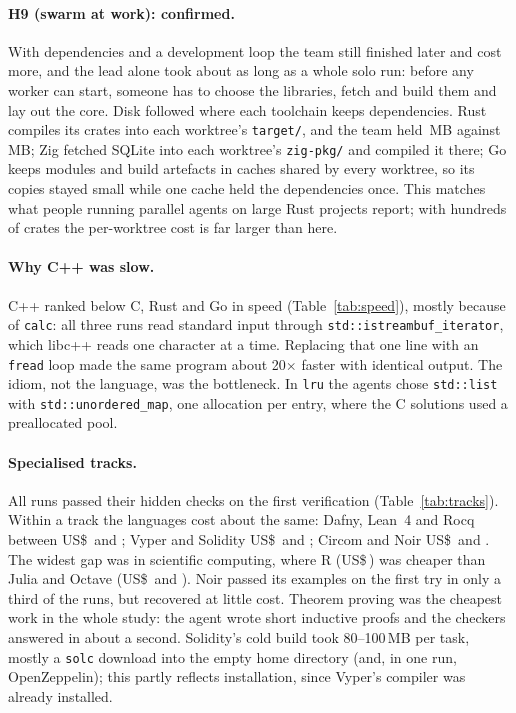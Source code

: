 \documentclass[11pt,a4paper]{article}
\begin{document}
\paragraph{H9 (swarm at work): confirmed.} With dependencies and a development loop the team still finished
later and cost more, and the lead alone took about as long as a whole solo run: before any worker can start,
someone has to choose the libraries, fetch and build them and lay out the core. Disk followed where each
toolchain keeps dependencies. Rust compiles its crates into each worktree's \texttt{target/}, and the team
held \NotesPeakTeamRust\,MB against \NotesPeakSoloRust\,MB; Zig fetched SQLite into each worktree's
\texttt{zig-pkg/} and compiled it there; Go keeps modules and build artefacts in caches shared by every
worktree, so its copies stayed small while one cache held the dependencies once. This matches what people
running parallel agents on large Rust projects report; with hundreds of crates the per-worktree cost is far
larger than here.

\paragraph{Why C++ was slow.} C++ ranked below C, Rust and Go in speed (Table~\ref{tab:speed}), mostly
because of \texttt{calc}: all three runs read standard input through \texttt{std::istreambuf\_iterator},
which libc++ reads one character at a time. Replacing that one line with an \texttt{fread} loop made the
same program about 20$\times$ faster with identical output. The idiom, not the language, was the
bottleneck. In \texttt{lru} the agents chose \texttt{std::list} with \texttt{std::unordered\_map}, one
allocation per entry, where the C solutions used a preallocated pool.

\paragraph{Specialised tracks.} All \NTrackRuns{} runs passed their hidden checks on the first
verification (Table~\ref{tab:tracks}). Within a track the languages cost about the same: Dafny,
Lean~4 and Rocq between US\$\,\TrkProofsDafny{} and \TrkProofsRocq{}; Vyper and Solidity
US\$\,\TrkEvmVyper{} and \TrkEvmSolidity{}; Circom and Noir US\$\,\TrkZkCircom{} and \TrkZkNoir{}. The
widest gap was in scientific computing, where R (US\$\,\TrkNumericR) was cheaper than Julia and Octave
(US\$\,\TrkNumericJulia{} and \TrkNumericOctave). Noir passed its examples on the first try in only a third
of the runs, but recovered at little cost. Theorem proving was the cheapest work in the whole study: the
agent wrote short inductive proofs and the checkers answered in about a second. Solidity's cold build
took 80--100\,MB per task, mostly a \texttt{solc} download into the empty home directory (and, in one
run, OpenZeppelin); this partly reflects installation, since Vyper's compiler was already installed.
\end{document}
